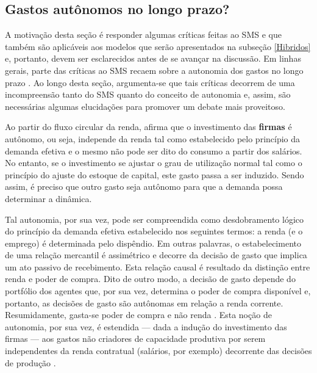 \subsection{Gastos autônomos no longo prazo?}
\label{CrescimentoAutonomo}

A motivação desta seção é responder algumas críticas feitas ao SMS e que também são aplicáveis aos modelos que serão apresentados na subseção \ref{Hibridos} e, portanto, devem ser esclarecidos antes de se avançar na discussão.
Em linhas gerais, parte das críticas ao SMS recaem sobre a autonomia dos gastos no longo prazo \cites{skott_autonomous_2017}{nikiforos_comments_2018}. 
Ao longo desta seção, argumenta-se que tais críticas decorrem de uma incompreensão tanto do SMS quanto do conceito de autonomia e, assim, são necessárias algumas elucidações para promover um debate mais proveitoso.


Ao partir do fluxo circular da renda, \textcite{serrano_long_1995} afirma que o investimento das \textbf{firmas} é autônomo, ou seja, independe da renda tal como estabelecido pelo princípio da demanda efetiva e o mesmo não pode ser dito do consumo a partir dos salários.
No entanto, se o investimento se ajustar o grau de utilização normal tal como o princípio do ajuste do estoque de capital, este gasto passa a ser induzido.
Sendo assim, é preciso que outro gasto seja autônomo para que a demanda possa determinar a dinâmica.

Tal autonomia, por sua vez, pode ser compreendida como desdobramento lógico do princípio da demanda efetiva estabelecido nos seguintes termos: a renda (e o emprego) é determinada pelo dispêndio. Em outras palavras, o estabelecimento de uma relação mercantil é assimétrico e decorre da decisão de gasto que implica um ato passivo de recebimento. 
Esta relação causal é resultado da distinção entre renda e poder de compra. Dito de outro modo, a decisão de gasto depende do portfólio dos agentes que, por sua vez, determina o poder de compra disponível e, portanto, as decisões de gasto são autônomas em relação a renda corrente.
Resumidamente, gasta-se poder de compra e não renda  \cites{possas_demanda_1981}[p.~47--72]{possas_dinamica_1987}[p.~1--9]{macedo_e_silva_macroeconomia_1999}.
Esta noção de autonomia, por sua vez, é estendida --- dada a indução do investimento das firmas --- aos gastos não criadores de capacidade produtiva por serem independentes da renda contratual (salários, por exemplo) decorrente das decisões de produção \cite{serrano_sraffian_1995}.



